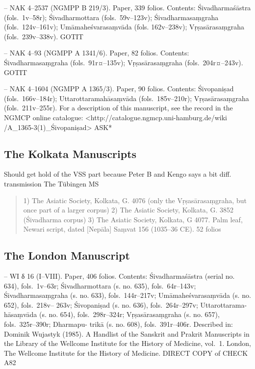 \documentclass[11pt]{book}
\begin{document}
-- NAK 4--2537 (NGMPP B 219/3). Paper, 339 folios. Contents:
Śivadharmaśāstra (fols.~1v--58r); Śivadharmottara (fols.~59v--123v);
Śivadharmasaṃgraha (fols.~124v--161v); Umāmaheśvarasaṃvāda (fols.
162v--238v); Vṛṣasārasaṃgraha (fols.~239v--338v). GOTIT

-- NAK 4--93 (NGMPP A 1341/6). Paper, 82 folios. Contents:
Śivadharmasaṃgraha (fols.~91r¤--135v); Vṛṣasārasaṃgraha
(fols.~204r¤--243v). GOTIT

-- NAK 4--1604 (NGMPP A 1365/3). Paper, 90 folios. Contents: Śivopaniṣad
(fols.~166v--184r); Uttarottaramahāsaṃvāda (fols.~185v--210r);
Vṛṣasārasaṃgraha (fols.~211v--255r). For a description of this
manuscript, see the record in the NGMCP online catalogue:
\textless{}http://catalogue.ngmcp.uni-hamburg.de/wiki
/A\_1365-3(1)\_Śivopaniṣad\textgreater{} ASK*


\subsection{The Kolkata Manuscripts}

Should get hold of the VSS part because Peter B and Kengo says a bit
diff. transmission The Tübingen MS

\begin{quote}
1) The Asiatic Society, Kolkata, G. 4076 (only the
Vṛṣasārasaṃgraha, but once part of a larger
corpus) 2) The Asiatic Society, Kolkata, G. 3852
(Śivadharma corpus) 3) The Asiatic Society, Kolkata,
G 4077. Palm leaf, Newari script, dated [Nepāla]
Saṃvat 156 (1035--36 CE). 52 folios
\end{quote}


\subsection{The London Manuscript}

-- WI δ 16 (I--VIII). Paper, 406 folios. Contents: Śivadharmaśāstra
(serial no. 634), fols.~1v--63r; Śivadharmottara (s. no. 635),
fols.~64r--143v; Śivadharmasaṃgraha (s. no. 633), fols.~144r--217v;
Umāmaheśvarasaṃvāda (s. no. 652), fols.~218v-- 263v; Śivopaniṣad (s. no.
636), fols.~264r--297v; Uttarottarama-hāsaṃvāda (s. no. 654),
fols.~298r--324r; Vṛṣasārasaṃgraha (s. no. 657), fols.~325r--390r;
Dharmapu- trikā (s. no. 608), fols.~391r--406r. Described in: Dominik
Wujastyk (1985). A Handlist of the Sanskrit and Prakrit Manuscripts in
the Library of the Wellcome Institute for the History of Medicine,
vol.~1. London, The Wellcome Institute for the History of Medicine.
DIRECT COPY of CHECK A82
\end{document}
